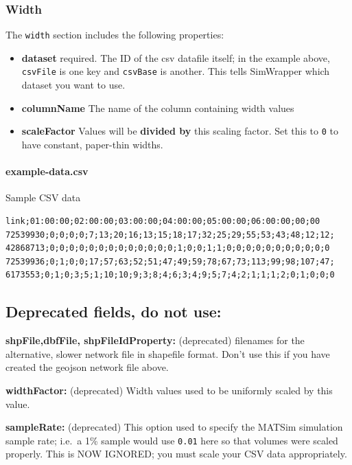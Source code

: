 \hypertarget{width}{%
\subsubsection{Width}\label{width}}

The \texttt{width} section includes the following properties:

\begin{itemize}
\tightlist
\item
  \textbf{dataset} required. The ID of the csv datafile itself; in the
  example above, \texttt{csvFile} is one key and \texttt{csvBase} is
  another. This tells SimWrapper which dataset you want to use.
\item
  \textbf{columnName} The name of the column containing width values
\item
  \textbf{scaleFactor} Values will be \textbf{divided by} this scaling
  factor. Set this to \texttt{0} to have constant, paper-thin widths.
\end{itemize}

\paragraph{example-data.csv} Sample CSV data

\begin{verbatim}
link;01:00:00;02:00:00;03:00:00;04:00:00;05:00:00;06:00:00;00;00
72539930;0;0;0;0;7;13;20;16;13;15;18;17;32;25;29;55;53;43;48;12;12;
42868713;0;0;0;0;0;0;0;0;0;0;0;0;0;1;0;0;1;1;0;0;0;0;0;0;0;0;0;0;0
72539936;0;1;0;0;17;57;63;52;51;47;49;59;78;67;73;113;99;98;107;47;
6173553;0;1;0;3;5;1;10;10;9;3;8;4;6;3;4;9;5;7;4;2;1;1;1;2;0;1;0;0;0
\end{verbatim}

\hypertarget{deprecated-fields-do-not-use}{%
\subsection{Deprecated fields, do not
use:}\label{deprecated-fields-do-not-use}}

\textbf{shpFile,dbfFile, shpFileIdProperty:} (deprecated) filenames for
the alternative, slower network file in shapefile format. Don't use this
if you have created the geojson network file above.

\noindent\textbf{widthFactor:} (deprecated) Width values used to be uniformly
scaled by this value.

\noindent\textbf{sampleRate:} (deprecated) This option used to specify the MATSim
simulation sample rate; i.e.~a 1\% sample would use \texttt{0.01} here
so that volumes were scaled properly. This is NOW IGNORED; you must
scale your CSV data appropriately.
